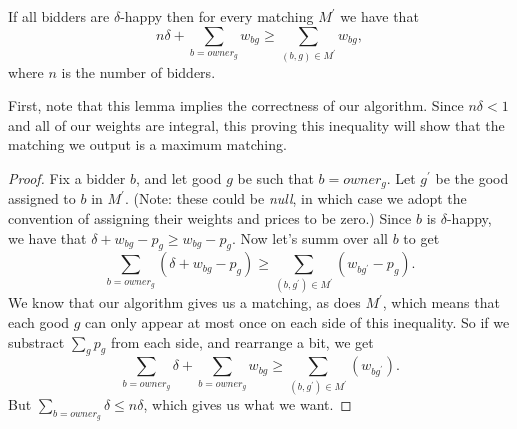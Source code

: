 \documentclass[11pt]{article}
\renewcommand{\'}{^{'}}
\newenvironment{lemma}[2][Lemma]{\begin{trivlist}
\item[\hskip \labelsep {\bfseries #1}\hskip \labelsep {\bfseries #2.}]}{\end{trivlist}}
\begin{document}
\begin{lemma}{}
	If all bidders are $\delta$-happy then for every matching $M\'$ we have that 
	\[
		n\delta + \sum_{b = owner_g} w_{bg} \geq \sum_{(b,g)\in M\'} w_{bg},
	\]
	where $n$ is the number of bidders. 
\end{lemma}

First, note that this lemma implies the correctness of our algorithm. Since $n\delta < 1$ and all of 
our weights are integral, this proving this inequality will show that the matching we output is 
a maximum matching.

\begin{proof}
	Fix a bidder $b$, and let good $g$ be such that $b = owner_g$. Let $g\'$ be the good assigned 
	to $b$ in $M\'$. (Note: these could be \emph{null}, in which case we adopt the convention of 
	assigning their weights and prices to be zero.) Since $b$ is $\delta$-happy, we have that 
	$\delta + w_{bg} - p_g \geq w_{bg} - p_g$. Now let's summ over all $b$ to get 
	\[
		\sum_{b=owner_g} (\delta + w_{bg} - p_g) \geq \sum_{(b,g\')\in M\'} (w_{bg\'} - p_g).
	\]
	We know that our algorithm gives us a matching, as does $M\'$, which means that each good $g$ 
	can only appear at most once on each side of this inequality. So if we substract $\sum_g p_g$ 
	from each side, and rearrange a bit, we get 
	\[
		\sum_{b=owner_g} \delta + \sum_{b=owner_g} w_{bg} \geq \sum_{(b,g\')\in M\'} (w_{bg\'}). 
	\]
	But $\sum_{b=owner_g} \delta \leq n\delta$, which gives us what we want.
\end{proof}
\end{document}
